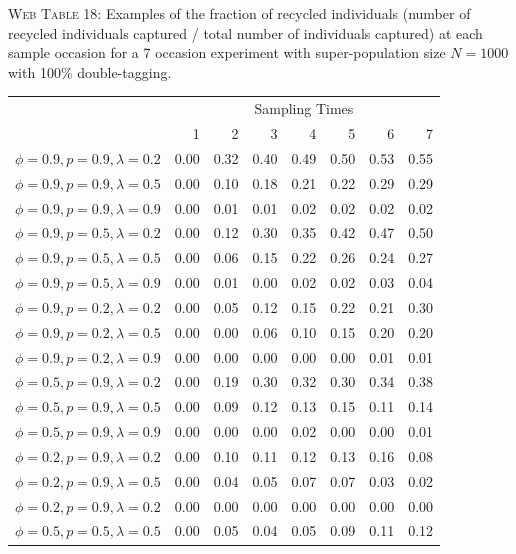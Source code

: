 \documentclass[]{article}
\begin{document}
\textsc{Web Table 18:} Examples of the fraction of recycled individuals
(number of recycled individuals captured / total number of individuals
captured) at each sample occasion for a 7 occasion experiment with
super-population size \(N=1000\) with 100\% double-tagging.

\begin{table}[ht]
\begin{tabular}{rrrrrrrr}
  \hline
  & \multicolumn{7}{c}{Sampling Times}\\
 & 1 & 2 & 3 & 4 & 5 & 6 & 7 \\ 
  \hline
  $\phi=0.9, p=0.9, \lambda=0.2$ & 0.00 & 0.32 & 0.40 & 0.49 & 0.50 & 0.53 & 0.55 \\ 
  $\phi=0.9, p=0.9, \lambda=0.5$ & 0.00 & 0.10 & 0.18 & 0.21 & 0.22 & 0.29 & 0.29 \\ 
  $\phi=0.9, p=0.9, \lambda=0.9$ & 0.00 & 0.01 & 0.01 & 0.02 & 0.02 & 0.02 & 0.02 \\ \hline
  $\phi=0.9, p=0.5, \lambda=0.2$ & 0.00 & 0.12 & 0.30 & 0.35 & 0.42 & 0.47 & 0.50 \\ 
  $\phi=0.9, p=0.5, \lambda=0.5$ & 0.00 & 0.06 & 0.15 & 0.22 & 0.26 & 0.24 & 0.27 \\ 
  $\phi=0.9, p=0.5, \lambda=0.9$ & 0.00 & 0.01 & 0.00 & 0.02 & 0.02 & 0.03 & 0.04 \\ \hline
  $\phi=0.9, p=0.2, \lambda=0.2$ & 0.00 & 0.05 & 0.12 & 0.15 & 0.22 & 0.21 & 0.30 \\ 
  $\phi=0.9, p=0.2, \lambda=0.5$ & 0.00 & 0.00 & 0.06 & 0.10 & 0.15 & 0.20 & 0.20 \\ 
  $\phi=0.9, p=0.2, \lambda=0.9$ & 0.00 & 0.00 & 0.00 & 0.00 & 0.00 & 0.01 & 0.01 \\ \hline
  $\phi=0.5, p=0.9, \lambda=0.2$ & 0.00 & 0.19 & 0.30 & 0.32 & 0.30 & 0.34 & 0.38 \\ 
  $\phi=0.5, p=0.9, \lambda=0.5$ & 0.00 & 0.09 & 0.12 & 0.13 & 0.15 & 0.11 & 0.14 \\ 
  $\phi=0.5, p=0.9, \lambda=0.9$ & 0.00 & 0.00 & 0.00 & 0.02 & 0.00 & 0.00 & 0.01 \\ \hline
  $\phi=0.2, p=0.9, \lambda=0.2$ & 0.00 & 0.10 & 0.11 & 0.12 & 0.13 & 0.16 & 0.08 \\ 
  $\phi=0.2, p=0.9, \lambda=0.5$ & 0.00 & 0.04 & 0.05 & 0.07 & 0.07 & 0.03 & 0.02 \\ 
  $\phi=0.2, p=0.9, \lambda=0.2$ & 0.00 & 0.00 & 0.00 & 0.00 & 0.00 & 0.00 & 0.00 \\ \hline
    $\phi=0.5, p=0.5, \lambda=0.5$ & 0.00 & 0.05 & 0.04 & 0.05 & 0.09 & 0.11 & 0.12 \\ \hline
\end{tabular}
\end{table}
\end{document}
